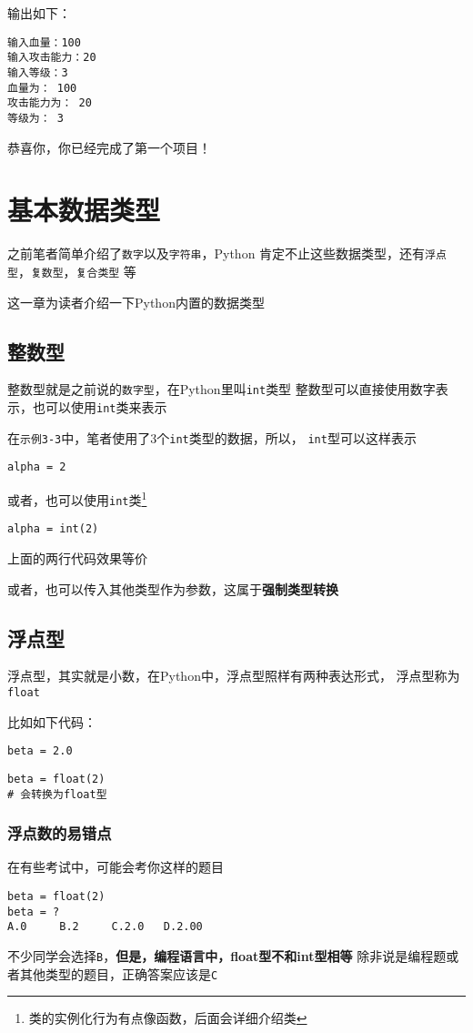 \documentclass{book}
\begin{document}
输出如下：
\begin{verbatim}
输入血量：100
输入攻击能力：20
输入等级：3
血量为： 100
攻击能力为： 20
等级为： 3
\end{verbatim}
恭喜你，你已经完成了第一个项目！
\chapter{基本数据类型}
\indent 之前笔者简单介绍了\verb|数字|以及\verb|字符串|，Python
肯定不止这些数据类型，还有\verb|浮点型|，\verb|复数型|，\verb|复合类型|
等


这一章为读者介绍一下Python内置的数据类型
\section{整数型}
\indent 整数型就是之前说的\verb|数字型|，在Python里叫\verb|int|类型
整数型可以直接使用数字表示，也可以使用\verb|int|类来表示


在\verb|示例3-3|中，笔者使用了3个\verb|int|类型的数据，所以，
\verb|int|型可以这样表示


\begin{verbatim}
alpha = 2
\end{verbatim}
或者，也可以使用\verb|int|类\footnote{类的实例化行为有点像函数，后面会详细介绍类}
\begin{verbatim}
alpha = int(2)
\end{verbatim}
上面的两行代码效果等价


或者，也可以传入其他类型作为参数，这属于\textbf{强制类型转换}
\section{浮点型}
\indent 浮点型，其实就是小数，在Python中，浮点型照样有两种表达形式，
浮点型称为\verb|float|



比如如下代码：
\begin{verbatim}
beta = 2.0
\end{verbatim}
\begin{verbatim}
beta = float(2)
# 会转换为float型
\end{verbatim}

\subsection{浮点数的易错点}
\indent 在有些考试中，可能会考你这样的题目
\begin{verbatim}
beta = float(2)
beta = ?
A.0     B.2     C.2.0   D.2.00
\end{verbatim}
不少同学会选择\verb|B|，\textbf{但是，编程语言中，float型不和int型相等}
除非说是编程题或者其他类型的题目，正确答案应该是\verb|C|
\end{document}
